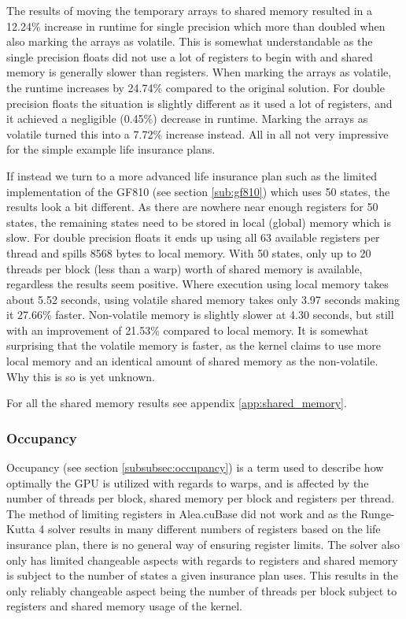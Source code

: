 The results of moving the temporary arrays to shared memory resulted in a 12.24\% increase in runtime for single precision which more than doubled when also marking the arrays as volatile.
This is somewhat understandable as the single precision floats did not use a lot of registers to begin with and shared memory is generally slower than registers.
When marking the arrays as volatile, the runtime increases by 24.74\% compared to the original solution.
For double precision floats the situation is slightly different as it used a lot of registers, and it achieved a negligible (0.45\%) decrease in runtime.
Marking the arrays as volatile turned this into a 7.72\% increase instead.
All in all not very impressive for the simple example life insurance plans.

If instead we turn to a more advanced life insurance plan such as the limited implementation of the GF810 (see section \ref{sub:gf810}) which uses 50 states, the results look a bit different.
As there are nowhere near enough registers for 50 states, the remaining states need to be stored in local (global) memory which is slow.
For double precision floats it ends up using all 63 available registers per thread and spills 8568 bytes to local memory.
With 50 states, only up to 20 threads per block (less than a warp) worth of shared memory is available, regardless the results seem positive.
Where execution using local memory takes about 5.52 seconds, using volatile shared memory takes only 3.97 seconds making it 27.66\% faster.
Non-volatile memory is slightly slower at 4.30 seconds, but still with an improvement of 21.53\% compared to local memory.
It is somewhat surprising that the volatile memory is faster, as the kernel claims to use more local memory and an identical amount of shared memory as the non-volatile.
Why this is so is yet unknown.

For all the shared memory results see appendix \ref{app:shared_memory}.

\subsubsection{Occupancy}\label{subsubsec:test:occupancy}
Occupancy (see section \ref{subsubsec:occupancy}) is a term used to describe how optimally the GPU is utilized with regards to warps, and is affected by the number of threads per block, shared memory per block and registers per thread.
The method of limiting registers in Alea.cuBase did not work and as the Runge-Kutta 4 solver results in many different numbers of registers based on the life insurance plan, there is no general way of ensuring register limits.
The solver also only has limited changeable aspects with regards to registers and shared memory is subject to the number of states a given insurance plan uses.
This results in the only reliably changeable aspect being the number of threads per block subject to registers and shared memory usage of the kernel.

